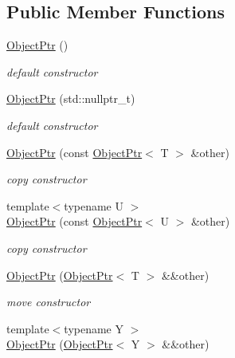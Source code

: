 \subsection*{Public Member Functions}
\begin{DoxyCompactItemize}
\item 
\hyperlink{classtvm_1_1runtime_1_1ObjectPtr_a29eed1f62407d1ea7b28725ea620f0e4}{Object\+Ptr} ()
\begin{DoxyCompactList}\small\item\em default constructor \end{DoxyCompactList}\item 
\hyperlink{classtvm_1_1runtime_1_1ObjectPtr_a4e8fc75dab845ba616f4d4dc31c5164f}{Object\+Ptr} (std\+::nullptr\+\_\+t)
\begin{DoxyCompactList}\small\item\em default constructor \end{DoxyCompactList}\item 
\hyperlink{classtvm_1_1runtime_1_1ObjectPtr_a4feb081f219dfa65775d46f15fd898c4}{Object\+Ptr} (const \hyperlink{classtvm_1_1runtime_1_1ObjectPtr}{Object\+Ptr}$<$ T $>$ \&other)
\begin{DoxyCompactList}\small\item\em copy constructor \end{DoxyCompactList}\item 
{\footnotesize template$<$typename U $>$ }\\\hyperlink{classtvm_1_1runtime_1_1ObjectPtr_adccc0605a72bbf2806b0a2c415f82382}{Object\+Ptr} (const \hyperlink{classtvm_1_1runtime_1_1ObjectPtr}{Object\+Ptr}$<$ U $>$ \&other)
\begin{DoxyCompactList}\small\item\em copy constructor \end{DoxyCompactList}\item 
\hyperlink{classtvm_1_1runtime_1_1ObjectPtr_ab9a13c742256492a2bb19070e41697f2}{Object\+Ptr} (\hyperlink{classtvm_1_1runtime_1_1ObjectPtr}{Object\+Ptr}$<$ T $>$ \&\&other)
\begin{DoxyCompactList}\small\item\em move constructor \end{DoxyCompactList}\item 
{\footnotesize template$<$typename Y $>$ }\\\hyperlink{classtvm_1_1runtime_1_1ObjectPtr_a62e18d1b81152c6caf93961eca6d04bc}{Object\+Ptr} (\hyperlink{classtvm_1_1runtime_1_1ObjectPtr}{Object\+Ptr}$<$ Y $>$ \&\&other)

\end{DoxyCompactItemize}
